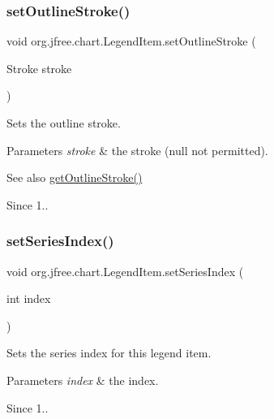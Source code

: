 \subsubsection{\texorpdfstring{set\+Outline\+Stroke()}{setOutlineStroke()}}
{\footnotesize\ttfamily void org.\+jfree.\+chart.\+Legend\+Item.\+set\+Outline\+Stroke (\begin{DoxyParamCaption}\item[{Stroke}]{stroke }\end{DoxyParamCaption})}

Sets the outline stroke.


\begin{DoxyParams}{Parameters}
{\em stroke} & the stroke ({\ttfamily null} not permitted).\\
\hline
\end{DoxyParams}
\begin{DoxySeeAlso}{See also}
\mbox{\hyperlink{classorg_1_1jfree_1_1chart_1_1_legend_item_a9fd24f701026a5ea52ce85f5e358e877}{get\+Outline\+Stroke()}}
\end{DoxySeeAlso}
\begin{DoxySince}{Since}
1.. 
\end{DoxySince}
\mbox{\label{classorg_1_1jfree_1_1chart_1_1_legend_item_a7fd59fcc9af93aac89a1142468588768}} 
\subsubsection{\texorpdfstring{set\+Series\+Index()}{setSeriesIndex()}}
{\footnotesize\ttfamily void org.\+jfree.\+chart.\+Legend\+Item.\+set\+Series\+Index (\begin{DoxyParamCaption}\item[{int}]{index }\end{DoxyParamCaption})}

Sets the series index for this legend item.


\begin{DoxyParams}{Parameters}
{\em index} & the index.\\
\hline
\end{DoxyParams}
\begin{DoxySince}{Since}
1.. 
\end{DoxySince}
\mbox{\label{classorg_1_1jfree_1_1chart_1_1_legend_item_abaaa01a07ecba893e71c52a54179c087}} 
